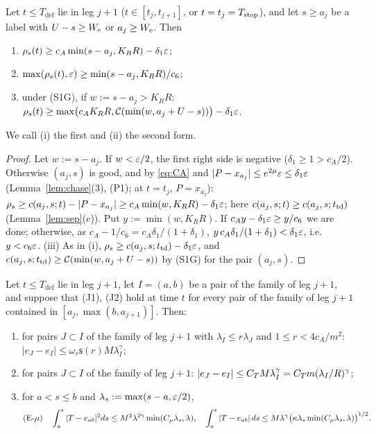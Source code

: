 \begin{lemma}\label{lem:dist}
Let $t\le T_{\mathrm{def}}$ lie in leg $j+1$ \textup($t\in[t_j,t_{j+1}]$, or $t=t_j=T_{\mathrm{stop}}$\textup), and let $s\ge a_j$ be a label
with $U-s\ge W_{\mathrm e}$ or $a_j\ge W_{\mathrm e}$. Then
\begin{enumerate}
\item[(i)] $\rho_s(t)\ge c_A\min(s-a_j,K_RR)-\delta_1\varepsilon$;
\item[(ii)] $\max(\rho_s(t),\varepsilon)\ge\min(s-a_j,K_RR)/c_6$;
\item[(iii)] under \textup{(S1G)}, if $w:=s-a_j>K_RR$: $\rho_s(t)\ge\max\bigl(c_AK_RR,\mathcal C(\min(w,a_j+U-s))\bigr)-\delta_1\varepsilon$.
\end{enumerate}
We call (i) the first and (ii) the second form.
\end{lemma}

\begin{proof}
Let $w:=s-a_j$. If $w<\varepsilon/2$, the first right side is negative ($\delta_1\ge1>c_A/2$). Otherwise $(a_j,s)$ is good, and by
\eqref{eq:CA} and $|P-x_{a_j}|\le e^{2\mu}\varepsilon\le\delta_1\varepsilon$ (Lemma~\ref{lem:chase}(3), (P1); at $t=t_j$, $P=x_{a_j}$):
$\rho_s\ge c(a_j,s;t)-|P-x_{a_j}|\ge c_A\min(w,K_RR)-\delta_1\varepsilon$; here $c(a_j,s;t)\ge c(a_j,s;t_{\mathrm{td}})$ (Lemma~\ref{lem:sep}(c)). Put
$y:=\min(w,K_RR)$. If $c_Ay-\delta_1\varepsilon\ge y/c_6$ we are done; otherwise, as $c_A-1/c_6=c_A\delta_1/(1+\delta_1)$,
$y\,c_A\delta_1/(1+\delta_1)<\delta_1\varepsilon$, i.e.\ $y<c_6\varepsilon$. (iii) As in (i), $\rho_s\ge c(a_j,s;t_{\mathrm{td}})-\delta_1\varepsilon$, and
$c(a_j,s;t_{\mathrm{td}})\ge\mathcal C(\min(w,a_j+U-s))$ by (S1G) for the pair $(a_j,s)$.
\end{proof}

\begin{lemma}[Tilts]\label{lem:tilt}
Let $t\le T_{\mathrm{def}}$ lie in leg $j+1$, let $I=(a,b)$ be a pair of the family of leg $j+1$, and suppose that \textup{(J1)},
\textup{(J2)} hold at time $t$ for every pair of the family of leg $j+1$ contained in $[a_j,\max(b,a_{j+1})]$. Then:
\begin{enumerate}
\item[(o)] for pairs $J\subset I$ of the family of leg $j+1$ with $\lambda_I\le r\lambda_J$ and $1\le r<4c_A/m^2$:
$|e_J-e_I|\le\omega_r\mathsf s(r)M\lambda_I^\gamma$;
\item[(i)] for pairs $J\subset I$ of the family of leg $j+1$: $|e_J-e_I|\le C_T M\lambda_I^\gamma=C_T m(\lambda_I/R)^\gamma$;
\item[(ii)] for $a<s\le b$ and $\lambda_s:=\max(s-a,\varepsilon/2)$,
\begin{equation}\label{eq:Emu}
\textup{(E-$\mu$)}\quad\int_a^s|T-e_{ab}|^2ds\le M^2\lambda^{2\gamma}\min(C_\mu\lambda_s,\lambda),\quad
\int_a^s|T-e_{ab}|\,ds\le M\lambda^\gamma\bigl(\kappa\lambda_s\min(C_\mu\lambda_s,\lambda)\bigr)^{1/2}.
\end{equation}
\end{enumerate}
\end{lemma}

